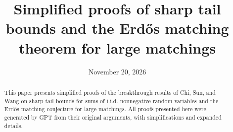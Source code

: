 \documentclass[10pt]{article}
\title{\Large\bfseries Simplified proofs of sharp tail bounds and the Erd\H{o}s matching theorem for large matchings}
\author{}
\date{November 20, 2026}
\numberwithin{equation}{section}
\theoremstyle{definition}
\newcommand{\1}{\mathbf 1}
\begin{document}
\maketitle
\begin{abstract}
This paper presents simplified proofs of the breakthrough results of Chi, Sun, and Wang on sharp tail bounds for sums of i.i.d. nonnegative random variables and the Erd\H{o}s matching conjecture for large matchings. All proofs presented here were generated by GPT from their original arguments, with simplifications and expanded details.
\end{abstract}








\appendix



\end{document}
